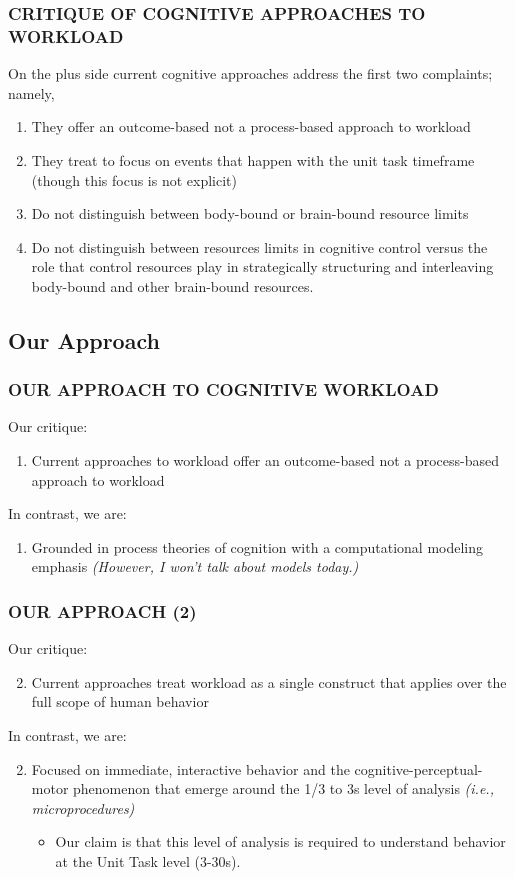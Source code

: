 \documentclass{beamer}
\begin{document}
\begin{frame}
	\frametitle{CRITIQUE OF COGNITIVE APPROACHES TO WORKLOAD}
On the plus side current cognitive approaches address the first two complaints; namely,
	\begin{enumerate}
		\item They offer an outcome-based not a process-based approach to workload
		\item They treat to focus on events that happen with the unit task timeframe (though this focus is not explicit)
	\pause
		\item Do not distinguish between body-bound or brain-bound resource limits
		\item Do not distinguish between resources limits in cognitive control versus the role that control resources play in strategically structuring and interleaving body-bound and other brain-bound resources.
	\end{enumerate}
\end{frame}


\subsection{Our Approach}

\begin{frame}
	\frametitle{OUR APPROACH TO COGNITIVE WORKLOAD}
Our critique:
	\begin{enumerate}
		\item Current approaches to workload offer an outcome-based not a process-based approach to workload
	\end{enumerate}
	\pause
In contrast, we are:
	\begin{enumerate}
		\item Grounded in process theories of cognition with a computational modeling emphasis \emph{(However, I won't talk about models today.)}
	\end{enumerate}
\end{frame}

\begin{frame}
	\frametitle{OUR APPROACH (2)}
Our critique:
	\begin{enumerate}
		\setcounter{enumi}{1}
		\item Current approaches treat workload as a single construct that applies over the full scope of human behavior
	\end{enumerate}
	\pause
In contrast, we are:
	\begin{enumerate}
		\setcounter{enumi}{1}
		\item Focused on immediate, interactive behavior and the cognitive-perceptual-motor phenomenon that emerge around the 1/3 to 3s level of analysis \emph{(i.e., microprocedures)}
		\begin{itemize}
			\item Our claim is that this level of analysis is required to understand behavior at the Unit Task level \parencite{cmn1983} (3-30s).
		\end{itemize}
	\end{enumerate}
\end{frame}
\end{document}
